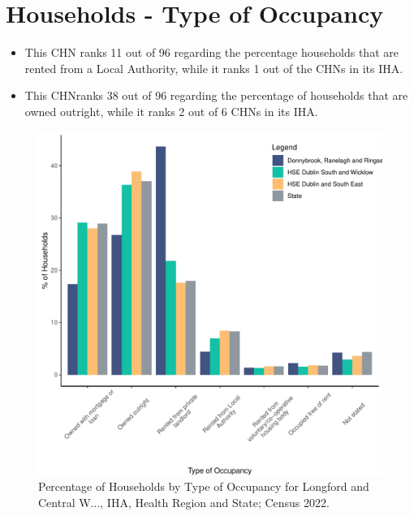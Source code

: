 \documentclass{article}
\begin{document}
\section{Households - Type of Occupancy}\label{sect:Households}
\begin{itemize}
\item This CHN ranks  11 out of 96 regarding the percentage households that are rented from a Local Authority, while it ranks  1 out of the CHNs in its IHA. 
\item This CHNranks  38 out of 96 regarding the percentage of households that are owned outright, while it ranks   2 out of 6 CHNs in its IHA.
\end{itemize}
\begin{figure}[H]
	\centering
	\includegraphics[width = 140mm]{../figures/HouseholdsED.pdf}
	\caption{Percentage of Households by Type of Occupancy for Longford and Central W..., IHA, Health Region and State; Census 2022.}
	\label{fig:vbnv}
	\end{figure}
\end{document}
